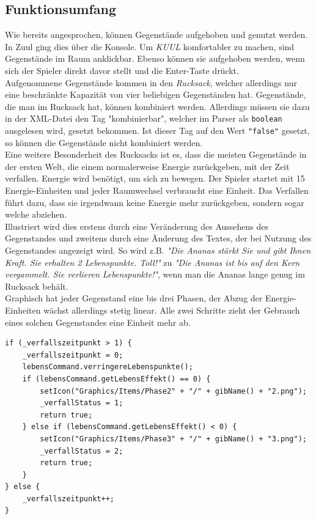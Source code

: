 \documentclass[12pt,twoside]{article}
\theoremstyle{plain}
\theoremstyle{definition}
\theoremstyle{remark}
\begin{document}
\subsection{Funktionsumfang}
\label{ssec:main_func}
Wie bereits angesprochen, können Gegenstände aufgehoben und genutzt werden.\\
In Zuul ging dies über die Konsole.
Um \textit{KUUL} komfortabler zu machen, sind Gegenstände im Raum anklickbar.
Ebenso können sie aufgehoben werden, wenn sich der Spieler direkt davor stellt und die Enter-Taste drückt.\\%
Aufgenommene Gegenstände kommen in den \textit{Rucksack}, welcher allerdings nur eine beschränkte Kapazität von vier beliebigen Gegenständen hat.
Gegenstände, die man im Rucksack hat, können kombiniert werden.
Allerdings müssen sie dazu in der XML-Datei den Tag "kombinierbar", welcher im Parser als \texttt{boolean} ausgelesen wird, gesetzt bekommen.
Ist dieser Tag auf den Wert \texttt{"false"} gesetzt, so können die Gegenstände nicht kombiniert werden.\\
Eine weitere Besonderheit des Rucksacks ist es, dass die meisten Gegenstände in der ersten Welt, die einem normalerweise Energie zurückgeben, mit der Zeit verfallen.
Energie wird benötigt, um sich zu bewegen. Der Spieler startet mit 15 Energie-Einheiten und jeder Raumwechsel verbraucht eine Einheit.
Das Verfallen führt dazu, dass sie irgendwann keine Energie mehr zurückgeben, sondern sogar welche abziehen.
\\
Illustriert wird dies erstens durch eine Veränderung des Aussehens des Gegenstandes und zweitens durch eine Änderung des Textes, der bei Nutzung des Gegenstandes angezeigt wird. So wird z.B. \textit{"Die Ananas stärkt Sie und gibt Ihnen Kraft. Sie erhalten 2 Lebenspunkte. Toll!"} zu \textit{"Die Ananas ist bis auf den Kern vergammelt. Sie verlieren Lebenspunkte!"}, wenn man die Ananas lange genug im Rucksack behält.
\\
Graphisch hat jeder Gegenstand eine bis drei Phasen, der Abzug der Energie-Einheiten wächst allerdings stetig linear.
Alle zwei Schritte zieht der Gebrauch eines solchen Gegenstandes eine Einheit mehr ab.
\begin{lstlisting}[caption=Teilimplementation der Verringerung der Energieregeneration, label=code:main_func]
if (_verfallszeitpunkt > 1) {
	_verfallszeitpunkt = 0;
	lebensCommand.verringereLebenspunkte();
	if (lebensCommand.getLebensEffekt() == 0) {
		setIcon("Graphics/Items/Phase2" + "/" + gibName() + "2.png");
		_verfallStatus = 1;
		return true;
	} else if (lebensCommand.getLebensEffekt() < 0) {
		setIcon("Graphics/Items/Phase3" + "/" + gibName() + "3.png");
		_verfallStatus = 2;
		return true;
	}
} else {
	_verfallszeitpunkt++;
}
\end{lstlisting}
\end{document}
